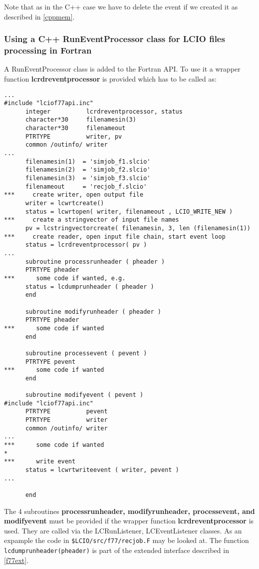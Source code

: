 Note that as in the C++ case we have to delete the event if we created it as described in \ref{cppmem}. \\

\subsubsection{Using a C++ RunEventProcessor class for LCIO files processing in Fortran}

A RunEventProcessor class is added to the Fortran API. To use it a wrapper function {\bf lcrdreventprocessor}
is provided which has to be called as:
\begin{verbatim}
...
#include "lciof77api.inc"
      integer          lcrdreventprocessor, status
      character*30     filenamesin(3)
      character*30     filenameout
      PTRTYPE          writer, pv
      common /outinfo/ writer
...
      filenamesin(1)  = 'simjob_f1.slcio'
      filenamesin(2)  = 'simjob_f2.slcio'
      filenamesin(3)  = 'simjob_f3.slcio'
      filenameout     = 'recjob_f.slcio'
***     create writer, open output file
      writer = lcwrtcreate()
      status = lcwrtopen( writer, filenameout , LCIO_WRITE_NEW )
***     create a stringvector of input file names
      pv = lcstringvectorcreate( filenamesin, 3, len (filenamesin(1))
***     create reader, open input file chain, start event loop
      status = lcrdreventprocessor( pv )
...
      subroutine processrunheader ( pheader )
      PTRTYPE pheader
***      some code if wanted, e.g.
      status = lcdumprunheader ( pheader )
      end

      subroutine modifyrunheader ( pheader )
      PTRTYPE pheader
***      some code if wanted
      end

      subroutine processevent ( pevent )
      PTRTYPE pevent
***      some code if wanted
      end

      subroutine modifyevent ( pevent )
#include "lciof77api.inc"
      PTRTYPE          pevent
      PTRTYPE          writer
      common /outinfo/ writer
...
***      some code if wanted
*
***      write event
      status = lcwrtwriteevent ( writer, pevent )
...

      end
\end{verbatim}

The 4 subroutines {\bf processrunheader, modifyrunheader, processevent, and modifyevent} must be provided if
the wrapper function {\bf lcrdreventprocessor} is used. They are called via the LCRunListener, LCEventListener classes.
As an expample the code in \verb#$LCIO/src/f77/recjob.F# may be looked at. 
The function \verb$lcdumprunheader(pheader)$ is part of the extended interface described in \ref{f77ext}.

